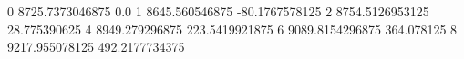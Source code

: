 0 8725.7373046875 0.0
1 8645.560546875 -80.1767578125
2 8754.5126953125 28.775390625
4 8949.279296875 223.5419921875
6 9089.8154296875 364.078125
8 9217.955078125 492.2177734375

